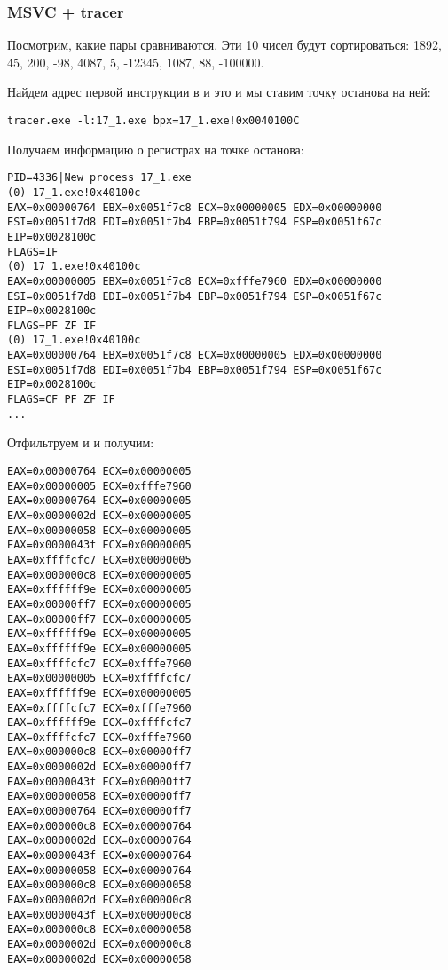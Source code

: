 

\subsubsection{MSVC + tracer}

Посмотрим, какие пары сравниваются.
Эти 10 чисел будут сортироваться: 
1892, 45, 200, -98, 4087, 5, -12345, 1087, 88, -100000.

Найдем адрес первой инструкции \CMP в \comp и это  и мы ставим точку останова на ней:%

\begin{lstlisting}
tracer.exe -l:17_1.exe bpx=17_1.exe!0x0040100C
\end{lstlisting}

Получаем информацию о регистрах на точке останова:

\begin{lstlisting}
PID=4336|New process 17_1.exe
(0) 17_1.exe!0x40100c
EAX=0x00000764 EBX=0x0051f7c8 ECX=0x00000005 EDX=0x00000000
ESI=0x0051f7d8 EDI=0x0051f7b4 EBP=0x0051f794 ESP=0x0051f67c
EIP=0x0028100c
FLAGS=IF
(0) 17_1.exe!0x40100c
EAX=0x00000005 EBX=0x0051f7c8 ECX=0xfffe7960 EDX=0x00000000
ESI=0x0051f7d8 EDI=0x0051f7b4 EBP=0x0051f794 ESP=0x0051f67c
EIP=0x0028100c
FLAGS=PF ZF IF
(0) 17_1.exe!0x40100c
EAX=0x00000764 EBX=0x0051f7c8 ECX=0x00000005 EDX=0x00000000
ESI=0x0051f7d8 EDI=0x0051f7b4 EBP=0x0051f794 ESP=0x0051f67c
EIP=0x0028100c
FLAGS=CF PF ZF IF
...
\end{lstlisting}

Отфильтруем  и  и получим:

\begin{lstlisting}
EAX=0x00000764 ECX=0x00000005
EAX=0x00000005 ECX=0xfffe7960
EAX=0x00000764 ECX=0x00000005
EAX=0x0000002d ECX=0x00000005
EAX=0x00000058 ECX=0x00000005
EAX=0x0000043f ECX=0x00000005
EAX=0xffffcfc7 ECX=0x00000005
EAX=0x000000c8 ECX=0x00000005
EAX=0xffffff9e ECX=0x00000005
EAX=0x00000ff7 ECX=0x00000005
EAX=0x00000ff7 ECX=0x00000005
EAX=0xffffff9e ECX=0x00000005
EAX=0xffffff9e ECX=0x00000005
EAX=0xffffcfc7 ECX=0xfffe7960
EAX=0x00000005 ECX=0xffffcfc7
EAX=0xffffff9e ECX=0x00000005
EAX=0xffffcfc7 ECX=0xfffe7960
EAX=0xffffff9e ECX=0xffffcfc7
EAX=0xffffcfc7 ECX=0xfffe7960
EAX=0x000000c8 ECX=0x00000ff7
EAX=0x0000002d ECX=0x00000ff7
EAX=0x0000043f ECX=0x00000ff7
EAX=0x00000058 ECX=0x00000ff7
EAX=0x00000764 ECX=0x00000ff7
EAX=0x000000c8 ECX=0x00000764
EAX=0x0000002d ECX=0x00000764
EAX=0x0000043f ECX=0x00000764
EAX=0x00000058 ECX=0x00000764
EAX=0x000000c8 ECX=0x00000058
EAX=0x0000002d ECX=0x000000c8
EAX=0x0000043f ECX=0x000000c8
EAX=0x000000c8 ECX=0x00000058
EAX=0x0000002d ECX=0x000000c8
EAX=0x0000002d ECX=0x00000058
\end{lstlisting}

